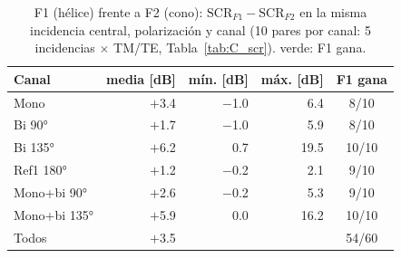 \begin{table}[H]
\centering\small
\caption{F1 (hélice) frente a F2 (cono): $\mathrm{SCR}_{F1}-\mathrm{SCR}_{F2}$ en la misma incidencia central, polarización y canal (10 pares por canal: 5 incidencias $\times$ TM/TE, Tabla~\ref{tab:C_scr}). \colorbox{mejor}{verde}: F1 gana.}
\label{tab:C_f1f2}
\begin{tabular}{@{}lrrrc@{}}
\toprule
Canal & media [dB] & mín. [dB] & máx. [dB] & F1 gana \\
\midrule
Mono & \cellcolor{mejor}$+$3.4 & $-$1.0 & 6.4 & 8/10 \\
Bi 90° & \cellcolor{mejor}$+$1.7 & $-$1.0 & 5.9 & 8/10 \\
Bi 135° & \cellcolor{mejor}$+$6.2 & 0.7 & 19.5 & 10/10 \\
Ref1 180° & \cellcolor{mejor}$+$1.2 & $-$0.2 & 2.1 & 9/10 \\
Mono+bi 90° & \cellcolor{mejor}$+$2.6 & $-$0.2 & 5.3 & 9/10 \\
Mono+bi 135° & \cellcolor{mejor}$+$5.9 & 0.0 & 16.2 & 10/10 \\
\midrule
Todos & $+$3.5 & & & 54/60 \\
\bottomrule
\end{tabular}
\end{table}
